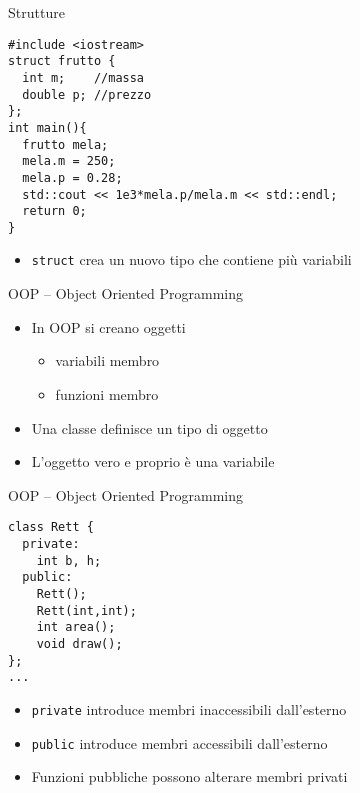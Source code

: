 \begin{frame}[fragile]{Strutture}
  \vfill
  \begin{lstlisting}
#include <iostream>
struct frutto {
  int m;    //massa
  double p; //prezzo
};
int main(){
  frutto mela;
  mela.m = 250;
  mela.p = 0.28;
  std::cout << 1e3*mela.p/mela.m << std::endl;
  return 0;
}
  \end{lstlisting}
  \vfill
  \begin{itemize}
    \item \lstinline$struct$ crea un nuovo tipo che contiene più variabili
  \end{itemize}
  \vfill
\end{frame}

\begin{frame}[fragile]{OOP -- Object Oriented Programming}
  \vfill
  \begin{itemize}
    \item In OOP si creano \alert{oggetti}
    \begin{itemize}
      \item variabili membro
      \item funzioni membro
    \end{itemize}
    \vfill
    \item Una \alert{classe} definisce un \alert{tipo} di oggetto
    \vfill
    \item L'oggetto vero e proprio è una variabile
  \end{itemize}
  \vfill
\end{frame}

\begin{frame}[fragile]{OOP -- Object Oriented Programming}
  \vfill
  \begin{lstlisting}[firstnumber=2]
class Rett {
  private:
    int b, h;
  public:
    Rett();
    Rett(int,int);
    int area();
    void draw();
};
...
  \end{lstlisting}
  \vfill
  \begin{itemize}
    \item \lstinline$private$ introduce membri inaccessibili dall'esterno
    \vfill
    \item \lstinline$public$ introduce membri accessibili dall'esterno
    \vfill
    \item Funzioni pubbliche possono alterare membri privati
  \end{itemize}
  \vfill
\end{frame}

